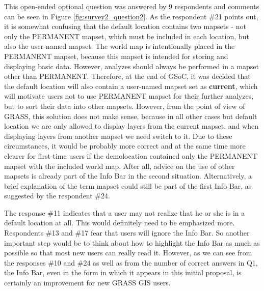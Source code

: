 \documentclass[a4paper,10pt,twoside]{article}
\begin{document}
\noindent This open-ended optional question was answered by 9 respondents and comments can be seen in Figure \ref{fig:survey2_question2}. As the respondent \#21 points out, it is somewhat confusing that the default location contains two mapsets - not only the PERMANENT mapset, which must be included in each location, but also the user-named mapset. The world map is intentionally placed in the PERMANENT mapset, because this mapset is intended for storing and displaying basic data. However, analyzes should always be performed in a mapset other than PERMANENT. Therefore, at the end of GSoC, it was decided that the default location will also contain a user-named mapset set as \textbf{current},  which will motivate users not to use PERMANENT mapset for their further analyzes, but to sort their data into other mapsets. However, from the point of view of GRASS, this solution does not make sense, because in all other cases but default location we are only allowed to display layers from the current mapset, and when displaying layers from another mapset we need switch to it. Due to these circumstances, it would be probably more correct and at the same time more clearer for first-time users if the demolocation contained only the PERMANENT mapset with the included world map. After all, advice on the use of other mapsets is already part of the Info Bar in the second situation. Alternatively, a brief explanation of the term mapset could still be part of the first Info Bar, as suggested by the respondent \#24.

The response \#11 indicates that a user may not realize that he or she is in a default location at all. This would definitely need to be emphasized more. Respondents \#13 and \#17 fear that users will ignore the Info Bar. So another important step would be to think about how to highlight the Info Bar as much as possible so that most new users can really read it. However, as we can see from the responses \#10 and \#24 as well as from the number of correct answers in Q1, the Info Bar, even in the form in which it appears in this initial proposal, is certainly an improvement for new GRASS GIS users.
\end{document}
